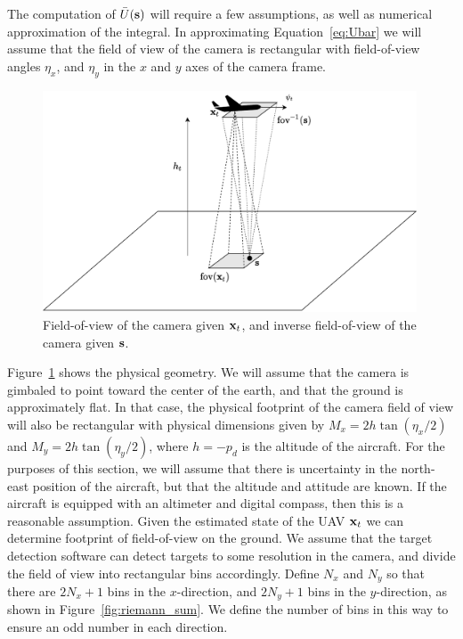 The computation of $\bar{U}(\mathbf{s})$ will require a few assumptions, as well as numerical approximation of the integral.
In approximating Equation~\eqref{eq:Ubar} we will assume that the field of view of the camera is rectangular with field-of-view angles $\eta_x$, and $\eta_y$ in the $x$ and $y$ axes of the camera frame. 
%
\begin{figure}[hbt]
  \centering\includegraphics[width=0.99\textwidth]{./chap5_trajectory_planning/figures/inverse_field_of_view}
  \caption{Field-of-view of the camera given $\mathbf{x}_t$, and inverse field-of-view of the camera given $\mathbf{s}$.}
  \label{fig:inverse_field_of_view}  
\end{figure}
%
Figure~\ref{fig:inverse_field_of_view} shows the physical geometry.  We will assume that the camera is gimbaled to point toward the center of the earth, and that the ground is approximately flat.  In that case, the physical footprint of the camera field of view will also be rectangular with physical dimensions given by $M_x = 2h\tan(\eta_x/2)$ and $M_y=2h\tan(\eta_y/2)$, where $h=-p_d$ is the altitude of the aircraft.  For the purposes of this section, we will assume that there is uncertainty in the north-east position of the aircraft, but that the altitude and attitude are known.  If the aircraft is equipped with an altimeter and digital compass, then this is a reasonable assumption.  
Given the estimated state of the UAV $\mathbf{x}_t$ we can determine footprint of field-of-view on the ground.  We assume that the target detection software can detect targets to some resolution in the camera, and divide the field of view into rectangular bins accordingly.  Define $N_x$ and $N_y$ so that there are $2N_x+1$ bins in the $x$-direction, and $2N_y+1$ bins in the $y$-direction, as shown in Figure~\ref{fig:riemann_sum}.  We define the number of bins in this way to ensure an odd number in each direction. 
